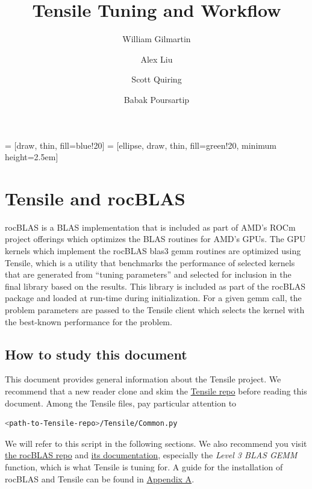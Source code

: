 \documentclass[]{article}
\title{Tensile Tuning and Workflow}
\author{William Gilmartin \and Alex Liu \and Scott Quiring \and Babak Poursartip}
\begin{document}
\maketitle

\newpage

\tableofcontents



 = [draw, thin, fill=blue!20]
 = [ellipse, draw, thin, fill=green!20, minimum height=2.5em]

\newpage

\section{Tensile and rocBLAS}


rocBLAS is a BLAS implementation that is included as part of AMD's ROCm project offerings which optimizes the BLAS routines for AMD's GPUs. The GPU kernels which implement the rocBLAS blas3 gemm routines are optimized using Tensile, which is a utility that benchmarks the performance of selected kernels that are generated from ``tuning parameters'' and selected for inclusion in the final library based on the results. This library is included as part of the rocBLAS package and loaded at run-time during initialization. For a given gemm call, the problem parameters are passed to the Tensile client which selects the kernel with the best-known performance for the problem.


\subsection{How to study this document}
This document provides general information about the Tensile project. We recommend that a new reader clone and skim the \href{https://github.com/ROCm/Tensile}{Tensile repo} before reading this document. Among the Tensile files, pay particular attention to

\begin{lstlisting}[language=bash,breaklines=true]
<path-to-Tensile-repo>/Tensile/Common.py
\end{lstlisting}

\noindent We will refer to this script in the following sections. We also recommend you visit \href{https://github.com/ROCm/rocBLAS}{the rocBLAS repo} and \href{https://rocblas.readthedocs.io/en/rocm-4.5.0/}{its documentation}, especially the \textit{Level 3 BLAS GEMM} function, which is what Tensile is tuning for. A guide for the installation of rocBLAS and Tensile can be found in \hyperref[sec:appendixA]{Appendix A}.
\end{document}
